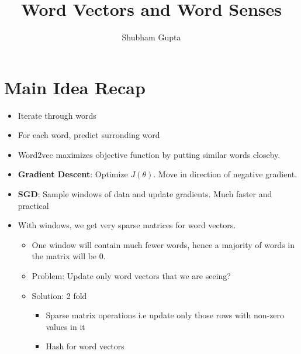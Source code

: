 \documentclass[a4paper]{article}
\title{Word Vectors and Word Senses}
\author{Shubham Gupta}
\begin{document}
\maketitle
\section{Main Idea Recap}
\begin{itemize}
    \item Iterate through words
    \item For each word, predict surronding word
    \item Word2vec maximizes objective function by putting similar words closeby.
    \item \textbf{Gradient Descent}: Optimize $J(\theta)$. Move in direction of negative gradient. 
    \item \textbf{SGD}: Sample windows of data and update gradients. Much faster and practical 
    \item With windows, we get very sparse matrices for word vectors.
        \begin{itemize}
            \item One window will contain much fewer words, hence a majority of words in the matrix will be 0.
            \item Problem: Update only word vectors that we are seeing?
            \item Solution: 2 fold
                \begin{itemize}
                    \item Sparse matrix operations i.e update only those rows with non-zero values in it
                    \item Hash for word vectors
                \end{itemize}
        \end{itemize}
\end{itemize}
\end{document}
